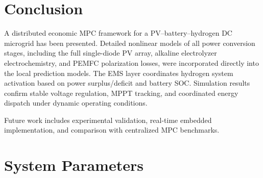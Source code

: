 \documentclass[journal]{IEEEtran}
\begin{document}
\section{Conclusion}
\label{sec:conclusion}

A distributed economic MPC framework for a PV--battery--hydrogen DC
microgrid has been presented. Detailed nonlinear models of all power
conversion stages, including the full single-diode PV array, alkaline
electrolyzer electrochemistry, and PEMFC polarization losses, were
incorporated directly into the local prediction models. The EMS layer
coordinates hydrogen system activation based on power surplus/deficit and
battery SOC. Simulation results confirm stable voltage regulation, MPPT
tracking, and coordinated energy dispatch under dynamic operating
conditions.

Future work includes experimental validation, real-time embedded
implementation, and comparison with centralized MPC benchmarks.

\appendix
\section{System Parameters}
\label{app:params}
\end{document}
